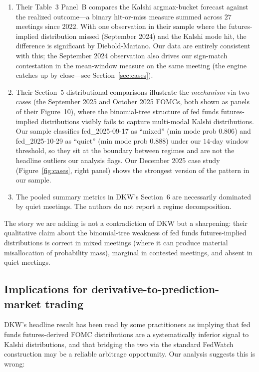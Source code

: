 \documentclass[11pt]{article}
\begin{document}
\begin{enumerate}[itemsep=0pt,topsep=0pt]
\item Their Table~3 Panel~B compares the Kalshi argmax-bucket forecast
against the realized outcome---a binary hit-or-miss measure summed
across $27$ meetings since 2022. With one observation in their sample
where the futures-implied distribution missed (September 2024) and
the Kalshi mode hit, the difference is significant by Diebold-Mariano.
Our data are entirely consistent with this; the September 2024
observation also drives our sign-match contestation in the
mean-window measure on the same meeting (the engine catches up by
close---see Section~\ref{sec:cases}).
\item Their Section~5 distributional comparisons illustrate the
\emph{mechanism} via two cases (the September 2025 and October 2025
FOMCs, both shown as panels of their Figure~10), where the
binomial-tree structure of fed funds futures-implied distributions
visibly fails to capture multi-modal Kalshi distributions. Our sample
classifies fed\_2025-09-17 as ``mixed'' (min mode prob $0.806$) and
fed\_2025-10-29 as ``quiet'' (min mode prob $0.888$) under our
$14$-day window threshold, so they sit at the boundary between
regimes and are not the headline outliers our analysis flags. Our
December 2025 case study (Figure~\ref{fig:cases}, right panel) shows
the strongest version of the pattern in our sample.
\item The pooled summary metrics in DKW's Section~6 are necessarily
dominated by quiet meetings. The authors do not report a regime
decomposition.
\end{enumerate}

The story we are adding is not a contradiction of DKW but a
sharpening: their qualitative claim about the binomial-tree weakness
of fed funds futures-implied distributions is correct in mixed
meetings (where it can produce material misallocation of probability
mass), marginal in contested meetings, and absent in quiet meetings.

\subsection{Implications for derivative-to-prediction-market trading}

DKW's headline result has been read by some practitioners as implying
that fed funds futures-derived FOMC distributions are a systematically
inferior signal to Kalshi distributions, and that bridging the two
via the standard FedWatch construction may be a reliable arbitrage
opportunity. Our analysis suggests this is wrong:
\end{document}
